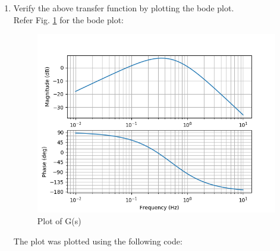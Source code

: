 \begin{enumerate}[label=\thesection.\arabic*.,ref=\thesection.\theenumi]
\item Verify the above transfer function by plotting the bode plot.
\\
\solution
Refer Fig. \ref{fig:ep18btech11016_fig2} for the bode plot:
\begin{center}
    \begin{figure}[!h]
    \centering
    \includegraphics[width=\columnwidth]{./figs/ep18btech11016_fig2.png}
    \caption{Plot of G(s)}
    \label{fig:ep18btech11016_fig2}
    \end{figure}
\end{center}

The plot was plotted using the following code:


\end{enumerate}
